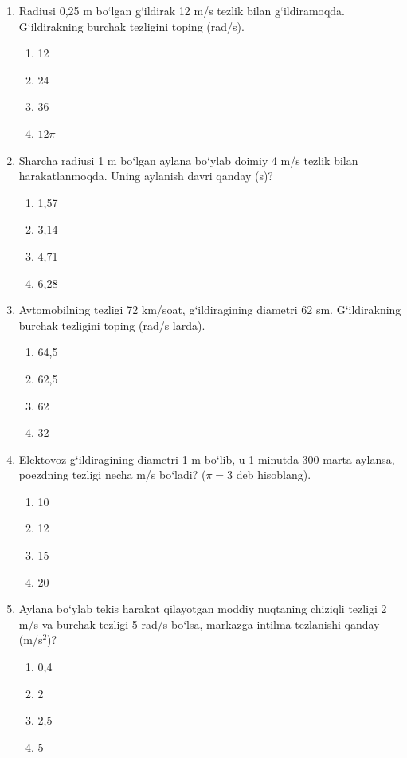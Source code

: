\begin{enumerate}
\item Radiusi 0,25 m bo‘lgan g‘ildirak 12 m/s tezlik bilan g‘ildiramoqda. G‘ildirakning burchak tezligini toping (rad/s).
\begin{enumerate}[label=\Alph*)]
\item 12
\item 24
\item 36
\item $12\pi$
\end{enumerate}

\item Sharcha radiusi 1 m bo‘lgan aylana bo‘ylab doimiy 4 m/s tezlik bilan harakatlanmoqda. Uning aylanish davri qanday (s)?
\begin{enumerate}[label=\Alph*)]
\item 1,57
\item 3,14
\item 4,71
\item 6,28
\end{enumerate}

\item Avtomobilning tezligi 72 km/soat, g‘ildiragining diametri 62 sm. G‘ildirakning burchak tezligini toping (rad/s larda).
\begin{enumerate}[label=\Alph*)]
\item 64,5
\item 62,5
\item 62
\item 32
\end{enumerate}

\item Elektovoz g‘ildiragining diametri 1 m bo‘lib, u 1 minutda 300 marta aylansa, poezdning tezligi necha m/s bo‘ladi? ($\pi=3$ deb hisoblang).
\begin{enumerate}[label=\Alph*)]
\item 10
\item 12
\item 15
\item 20
\end{enumerate}

\item Aylana bo‘ylab tekis harakat qilayotgan moddiy nuqtaning chiziqli tezligi 2 m/s va burchak tezligi 5 rad/s bo‘lsa, markazga intilma tezlanishi qanday (m/s$^2$)?
\begin{enumerate}[label=\Alph*)]
\item 0,4
\item 2
\item 2,5
\item 5
\end{enumerate}


\end{enumerate}

